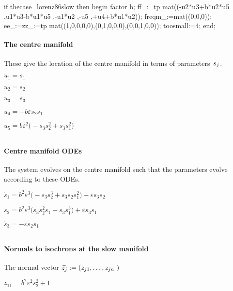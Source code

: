 \documentclass[11pt,a5paper]{article}
\def\eps{\varepsilon}
\begin{document}
\begin{reduce}
if thecase=lorenz86slow then begin
factor b;
ff_:=tp mat((-u2*u3+b*u2*u5
    ,u1*u3-b*u1*u5
    ,-u1*u2
    ,-u5
    ,+u4+b*u1*u2));
freqm_:=mat((0,0,0));
ee_:=zz_:=tp mat((1,0,0,0,0),(0,1,0,0,0),(0,0,1,0,0));
toosmall:=4;
end;
\end{reduce}

\paragraph{The centre manifold}
These give the location of the centre manifold in
terms of parameters~\(s\sb j\).
\(
\)\par

\(u_{1}=s_{1}
\)\par

\(u_{2}=s_{2}
\)\par

\(u_{3}=s_{3}
\)\par

\(u_{4}=-b \eps s_{2} s_{1}
\)\par

\(u_{5}=b \eps^{2} \big(-s_{3} s_{2}^{2}+s_{3} s_{1}^{2}\big)
\)\par

\(
\)
\paragraph{Centre manifold ODEs}
The system evolves on the centre manifold such
that the parameters evolve according to these ODEs.
\(
\)\par

\(\dot s_{1}=b^{2} \eps^{3} \big(-s_{3} s_{2}^{3}+s_{3} s_{2} s_{1}^{2}
\big)-\eps s_{3} s_{2}
\)\par

\(\dot s_{2}=b^{2} \eps^{3} \big(s_{3} s_{2}^{2} s_{1}-s_{3} s_{1}^{3}
\big)+\eps s_{3} s_{1}
\)\par

\(\dot s_{3}=-\eps s_{2} s_{1}
\)\par

\(
\)
\paragraph{Normals to isochrons at the slow manifold}
The normal vector \(\vec z\sb j:=(z\sb{j1},\ldots,z\sb{jn}\
)\)
\(
\)\par

\(z_{11}=b^{2} \eps^{2} s_{2}^{2}+1
\)\par
\end{document}
